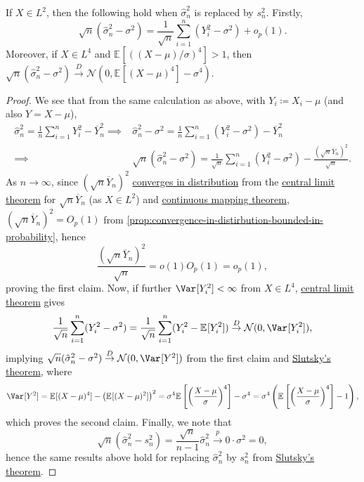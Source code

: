 \begin{proposition}\label{prop:inference-variance}
	If \(X \in L^2\), then the following hold when \(\hat{\sigma} _n^2\) is replaced by \(s_n^2\). Firstly,
	\[
		\sqrt{n} (\hat{\sigma} _n^2 - \sigma ^2)
		= \frac{1}{\sqrt{n} } \sum_{i=1}^{n} (Y_i^2 - \sigma ^2) + o_p(1).
	\]
	Moreover, if \(X \in L^4\) and \(\mathbb{E}_{}[( (X-\mu ) / \sigma ) ^4 ] > 1\), then \(\sqrt{n} (\hat{\sigma} _n^2 - \sigma ^2) \overset{D}{\to} \mathcal{N} (0, \mathbb{E}_{}[(X-\mu )^4 ] - \sigma ^4)\).
\end{proposition}
\begin{proof}
	We see that from the same calculation as above, with \(Y_i \coloneqq X_i - \mu \) (and also \(Y = X - \mu \)),
	\[
		\begin{split}
			\hat{\sigma} _n^2 = \frac{1}{n} \sum_{i=1}^{n} Y_i^2 - \overline{Y} _n^2
			\implies & \hat{\sigma} _n^2 - \sigma ^2 = \frac{1}{n} \sum_{i=1}^{n} (Y_i^2 - \sigma ^2)- \overline{Y} _n^2                                                    \\
			\implies & \sqrt{n}(\hat{\sigma } _n^2 - \sigma ^2) = \frac{1}{\sqrt{n} } \sum_{i=1}^{n} (Y_i^2 - \sigma ^2) - \frac{(\sqrt{n} \overline{Y} _n)^2}{\sqrt{n} } .
		\end{split}
	\]
	As \(n \to \infty \), since \((\sqrt{n} \overline{Y} _n)^2\) \hyperref[def:converge-in-distribution]{converges in distribution} from the \hyperref[thm:CLT]{central limit theorem} for \(\sqrt{n} \overline{Y} _n\) (as \(X \in L^2\)) and \hyperref[thm:continuous-mapping]{continuous mapping theorem}, \((\sqrt{n} \overline{Y} _n)^2 = O_p(1)\) from \autoref{prop:convergence-in-distirbution-bounded-in-probability}, hence
	\[
		\frac{(\sqrt{n} \overline{Y} _n) ^2}{\sqrt{n} }
		= o(1) O_p(1)
		= o_p(1),
	\]
	proving the first claim. Now, if further \(\Var_{}[Y_i^2] < \infty \) from \(X \in L^4\), \hyperref[thm:CLT]{central limit theorem} gives
	\[
		\frac{1}{\sqrt{n} } \sum_{i=1}^{n} (Y_i^2 - \sigma ^2)
		= \frac{1}{\sqrt{n} } \sum_{i=1}^{n} (Y_i^2 - \mathbb{E}_{}[Y_i^2] )
		\overset{D}{\to } \mathcal{N} (0, \Var_{}[Y_i^2] ),
	\]
	implying \(\sqrt{n} (\hat{\sigma} _n^2 - \sigma ^2) \overset{D}{\to } \mathcal{N} (0, \Var_{}[Y^2] )\) from the first claim and \hyperref[thm:Slutsky]{Slutsky's theorem}, where
	\[
		\Var_{}[Y^2]
		= \mathbb{E}_{}[(X - \mu )^4]  - \left( \mathbb{E}_{}[(X-\mu )^2] \right) ^2
		= \sigma ^4 \mathbb{E}_{}\left[\left( \frac{X-\mu }{\sigma } \right) ^4 \right] - \sigma ^4
		= \sigma ^4 \left( \mathbb{E}_{}\left[\left( \frac{X-\mu }{\sigma } \right) ^4 \right] - 1 \right),
	\]
	which proves the second claim. Finally, we note that
	\[
		\sqrt{n} (\hat{\sigma} _n^2 - s_n^2) = \frac{\sqrt{n} }{n-1} \hat{\sigma} _n^2 \overset{p}{\to} 0 \cdot \sigma ^2 = 0,
	\]
	hence the same results above hold for replacing \(\hat{\sigma} _n^2\) by \(s_n^2\) from \hyperref[thm:Slutsky]{Slutsky's theorem}.
\end{proof}

